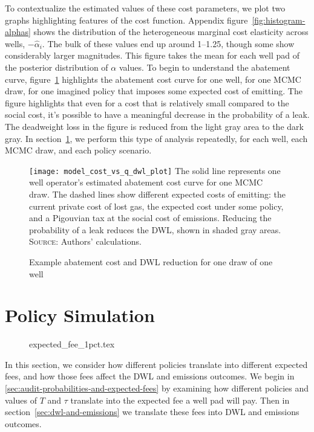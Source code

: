 \documentclass[12pt,oneside,letterpaper]{article}
\theoremstyle{definition}
\begin{document}
\begin{refsection}
To contextualize the estimated values of these cost parameters, we plot two graphs highlighting features of the cost function.
Appendix figure~\ref{fig:histogram-alphas} shows the distribution of the heterogeneous marginal cost elasticity across wells, \(-\hat{\alpha}_i\).
The bulk of these values end up around 1--1.25, though some show considerably larger magnitudes.
This figure takes the mean for each well pad of the posterior distribution of \(\alpha\) values.
To begin to understand the abatement curve, figure~\ref{fig:abatement-dwl-demo} highlights the abatement cost curve for one well, for one \gls{MCMC} draw, for one imagined policy that imposes some expected cost of emitting.
The figure highlights that even for a cost that is relatively small compared to the social cost, it's possible to have a meaningful decrease in the probability of a leak.
The deadweight loss in the figure is reduced from the light gray area to the dark gray.
In section~\ref{sec:policy-simulation}, we perform this type of analysis repeatedly, for each well, each \gls{MCMC} draw, and each policy scenario.


\begin{figure}[!bth]
\caption{Example abatement cost and \gls{DWL} reduction for one draw of one well}
\label{fig:abatement-dwl-demo}
\texttt{[image: model\_cost\_vs\_q\_dwl\_plot]}
{\small\singlespacing
\vspace*{-1\baselineskip}
The solid line represents one well operator's estimated abatement cost curve for one \gls{MCMC} draw.
The dashed lines show different expected costs of emitting: the current private cost of lost gas, the expected cost under some policy, and a Pigouvian tax at the social cost of emissions.
Reducing the probability of a leak reduces the \gls{DWL}, shown in shaded gray areas.\\
\textsc{Source:} Authors' calculations.
}
\end{figure}


\section{Policy Simulation}
\label{sec:policy-simulation}


\begin{figure}[!bth]
{expected_fee_1pct.tex} %
\end{figure}

In this section, we consider how different policies translate into different expected fees, and how those fees affect the \gls{DWL} and emissions outcomes.
We begin in \ref{sec:audit-probabilities-and-expected-fees} by examining how different policies and values of \(T\) and \(\tau\) translate into the expected fee a well pad will pay.
Then in section~\ref{sec:dwl-and-emissions} we translate these fees into \gls{DWL} and emissions outcomes.



\end{refsection}
\end{document}
